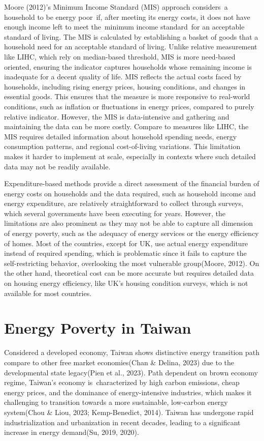 \documentclass[
  twoside,
  openright,
  degree    = master,               %
  language  = english,              %
  fontset   = overleaf,             %
  watermark = true,                 %
  doi       = true,                 %
]{ntuthesis}
\begin{document}
Moore (2012)'s Minimum Income Standard (MIS) approach considers~a
household to be energy poor~if, after meeting its energy costs, it does
not have enough income left to meet the~minimum income standard~for an
acceptable standard of living. The MIS is calculated by establishing a
basket of goods that a household need for an acceptable standard of
living. Unlike relative measurement like LIHC, which rely on
median-based threshold, MIS is more need-based oriented, ensuring the
indicator captures households whose remaining income is inadequate for a
decent quality of life. MIS reflects the actual costs faced by
households, including rising energy prices, housing conditions, and
changes in essential goods. This ensures that the measure is more
responsive to real-world conditions, such as inflation or fluctuations
in energy prices, compared to purely relative indicator. However, the
MIS is data-intensive and gathering and maintaining the data can be more
costly. Compare to measures like LIHC, the MIS requires detailed
information about household spending needs, energy consumption patterns,
and regional cost-of-living variations. This limitation makes it harder
to implement at scale, especially in contexts where such detailed data
may not be readily available.

Expenditure-based methods provide a direct assessment of the financial
burden of energy costs on households and the data required, such as
household income and energy expenditure, are relatively straightforward
to collect through surveys, which several governments have been
executing for years. However, the limitations are also prominent as they
may not be able to capture all dimension of energy poverty, such as the
adequacy of energy services or the energy efficiency of homes. Most of
the countries, except for UK, use actual energy expenditure instead of
required spending, which is problematic since it fails to capture the
self-restricting behavior, overlooking the most vulnerable group(Moore,
2012). On the other hand, theoretical cost can be more accurate but
requires detailed data on housing energy efficiency, like UK's housing
condition surveys, which is not available for most countries.

\hypertarget{energy-poverty-in-taiwan}{%
\section{Energy Poverty in Taiwan}\label{energy-poverty-in-taiwan}}

Considered a developed economy, Taiwan shows distinctive energy
transition path compare to other free market economies(Chan \& Delina,
2023) due to the developmental state legacy(Pien et al., 2023). Path
dependent on brown economy regime, Taiwan's economy is~characterized by
high carbon emissions, cheap energy prices, and the dominance of
energy-intensive industries, which makes it challenging to transition
towards a more sustainable, low-carbon energy system(Chou \& Liou, 2023;
Kemp-Benedict, 2014). Taiwan has undergone rapid industrialization and
urbanization in recent decades, leading to a significant increase in
energy demand(Su, 2019, 2020).
\end{document}
